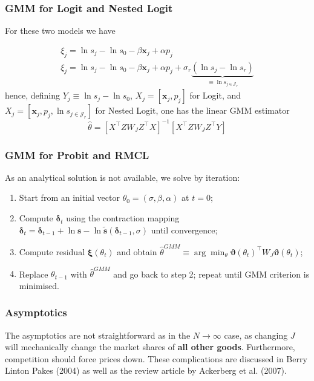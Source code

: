 \documentclass[11pt]{article}
\begin{document}
\subsubsection{GMM for Logit and Nested Logit}

For these two models we have

\begin{equation*}
	\begin{gathered}
			\xi_j = \ln s_j - \ln s_0 - \beta \bm{x}_j + \alpha p_j \\
			\xi_j = \ln s_j - \ln s_0 - \beta \bm{x}_j + \alpha p_j + \sigma_r\underbrace{(\ln s_j - \ln s_r)}_{\equiv \ln s_{j \in \mathscr{J}_r}}
	\end{gathered}
\end{equation*}
hence, defining $Y_j \equiv \ln s_j - \ln s_0$, $X_j = [\bm{x}_j, p_j]$ for Logit, and $X_j = [\bm{x}_j, p_j, \ln s_{j \in \mathscr{J}_r}]$ for Nested Logit, one has the linear GMM estimator
\begin{equation}
	\hat{\theta} = [X^\intercal Z W_J Z^\intercal X]^{-1}[X^\intercal Z W_J Z^\intercal Y]
\end{equation}

\subsubsection{GMM for Probit and RMCL}

As an analytical solution is not available, we solve by iteration:
\begin{enumerate}
	\item Start from an initial vector $\theta_0 = (\sigma, \beta, \alpha)$ at $t=0$;
	\item Compute $\bm{\delta}_t$ using the contraction mapping $\bm{\delta}_{t} = \bm{\delta}_{t-1} + \ln \bm{s} - \ln \bm{\tilde{s}}(\bm{\delta}_{t-1}, \sigma)$ until convergence;
	\item Compute residual $\bm{\xi}(\theta_t)$ and obtain $\hat{\theta}^{GMM} \equiv \arg\min_\theta \bm{\vartheta}(\theta_t)^\intercal W_J \bm{\vartheta}(\theta_t)$;
	\item Replace $\theta_{t-1}$ with $\hat{\theta}^{GMM}$ and go back to step 2; repeat until GMM criterion is minimised.
\end{enumerate}

\subsubsection{Asymptotics}
The asymptotics are not straightforward as in the $N \rightarrow  \infty$ case, as changing $J$ will mechanically change the market shares of \textbf{all other goods}.
Furthermore, competition should force prices down.
These complications are discussed in Berry Linton Pakes (2004) as well as the review article by Ackerberg et al. (2007).
\end{document}
